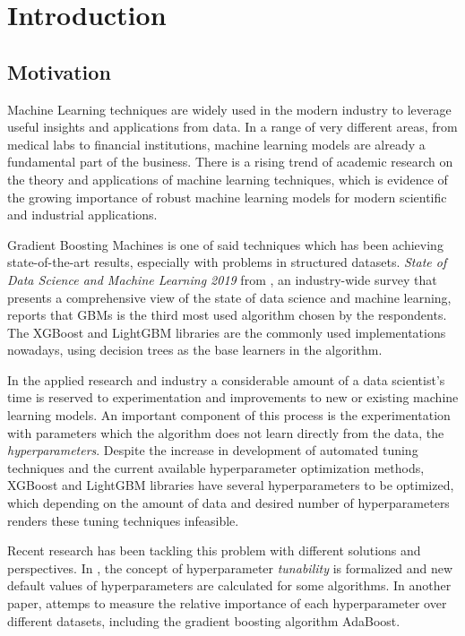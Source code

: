 \chapter{Introduction}
\label{cap:introduction}

\section{Motivation}
\label{sec:motivation}

Machine Learning techniques are widely used in the modern industry to leverage useful insights and applications from data. In a range of very different areas, from medical labs to financial institutions, machine learning models are already a fundamental part of the business. There is a rising trend of academic research on the theory and applications of machine learning techniques, which is evidence of the growing importance of robust machine learning models for modern scientific and industrial applications.

Gradient Boosting Machines is one of said techniques which has been achieving state-of-the-art results, especially with problems in structured datasets. \textit{State of Data Science and Machine Learning 2019} from \cite{kaggle:survey}, an industry-wide survey that presents a comprehensive view of the state of data science and machine learning, reports that GBMs is the third most used algorithm chosen by the respondents. The XGBoost and LightGBM libraries are the commonly used implementations nowadays, using decision trees as the base learners in the algorithm.

In the applied research and industry a considerable amount of a data scientist's time is reserved to experimentation and improvements to new or existing machine learning models. An important component of this process is the experimentation with parameters which the algorithm does not learn directly from the data, the \textit{hyperparameters}. Despite the increase in development of automated tuning techniques and the current available hyperparameter optimization methods, XGBoost and LightGBM libraries have several hyperparameters to be optimized, which depending on the amount of data and desired number of hyperparameters renders these tuning techniques infeasible.

Recent research has been tackling this problem with different solutions and perspectives. In \cite{probst2018tunability}, the concept of hyperparameter \textit{tunability} is formalized and new default values of hyperparameters are calculated for some algorithms. In another paper, \cite{van2018hyperparameter} attemps to measure the relative importance of each hyperparameter over different datasets, including the gradient boosting algorithm AdaBoost.

